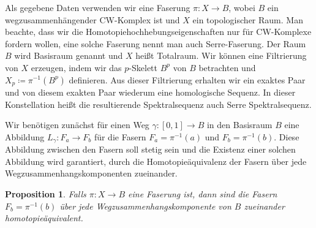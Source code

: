 \documentclass[12pt, hidelinks]{article}
\numberwithin{conj}{section}
\newtheorem{proposition}[conj]{Proposition}
\begin{document}
Als gegebene Daten verwenden wir eine Faserung $\pi: X \to B$, wobei $B$ ein wegzusammenhängender CW-Komplex ist und $X$ ein topologischer Raum. Man beachte, dass wir die Homotopiehochhebungseigenschaften nur für CW-Komplexe fordern wollen, eine solche Faserung nennt man auch Serre-Faserung. Der Raum $B$ wird Basisraum genannt und $X$ heißt Totalraum. Wir können eine Filtrierung von $X$ erzeugen, indem wir das $p$-Skelett $B^p$ von $B$ betrachten und $X_p \coloneq \pi^{-1}(B^p)$ definieren. Aus dieser Filtrierung erhalten wir ein exaktes Paar und von diesem exakten Paar wiederum eine homologische Sequenz. In dieser Konstellation heißt die resultierende Spektralsequenz auch Serre Spektralsequenz.

Wir benötigen zunächst für einen Weg $\gamma: [0,1] \to B$ in den Basisraum $B$ eine Abbildung $L_\gamma: F_a \to F_b$ für die Fasern $F_a = \pi^{-1}(a)$ und $F_b = \pi^{-1}(b)$. Diese Abbildung zwischen den Fasern soll stetig sein und die Existenz einer solchen Abbildung wird garantiert, durch die Homotopieäquivalenz der Fasern über jede Wegzusammenhangskomponenten zueinander.

\begin{proposition}
Falls $\pi: X \to B$ eine Faserung ist, dann sind die Fasern $F_b = \pi^{-1}(b)$ über jede Wegzusammenhangskomponente von $B$ zueinander homotopieäquivalent.
\end{proposition}
\end{document}
